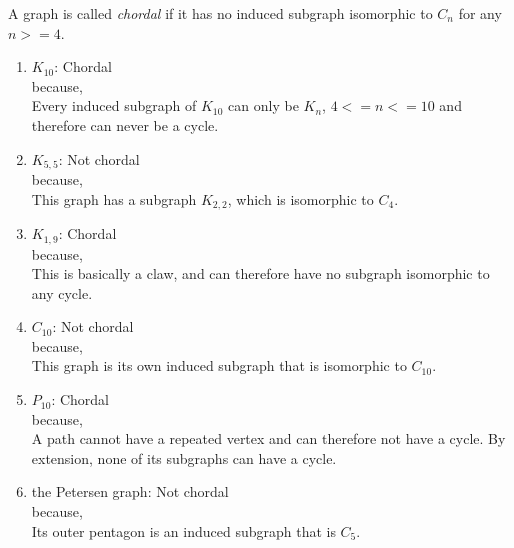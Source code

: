 \documentclass{article}
\begin{document}
		A graph is called \textit{chordal} if it has no induced subgraph isomorphic to $C_n$ for any $n>=4$.
		\begin{enumerate}
			\item $K_{10}$: Chordal\\
			because,\\
			Every induced subgraph of $K_{10}$ can only be $K_n$, $4 <= n <= 10$ and therefore can never be a cycle.\\
			
			\item $K_{5,5}$: Not chordal\\
			because,\\
			This graph has a subgraph $K_{2,2}$, which is isomorphic to $C_4$.\\

			\item $K_{1,9}$: Chordal\\
			because,\\
			This is basically a claw, and can therefore have no subgraph isomorphic to any cycle.\\
			
			\item $C_{10}$: Not chordal\\
			because,\\
			This graph is its own induced subgraph that is isomorphic to $C_{10}$.\\

			\item $P_{10}$: Chordal\\
			because,\\
			A path cannot have a repeated vertex and can therefore not have a cycle. By extension, none of its subgraphs can have a cycle.\\

			\item the Petersen graph: Not chordal\\
			because,\\
			Its outer pentagon is an induced subgraph that is $C_5$.\\
		\end{enumerate}
		
\end{document}
